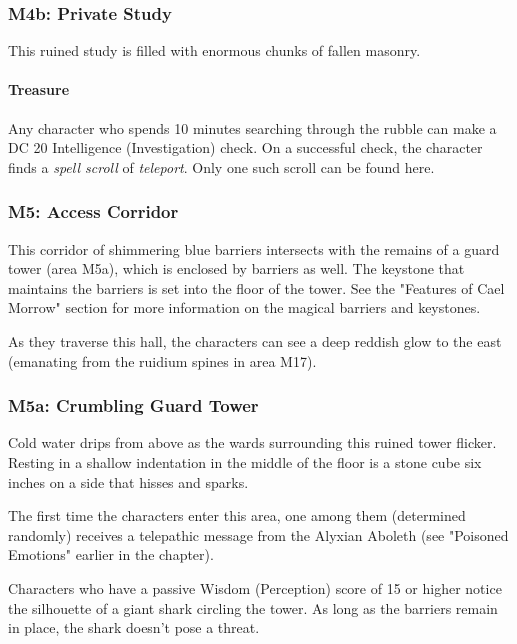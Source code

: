 \documentclass[letterpaper, 11pt, bg=full, twocolumn]{dndbook}
\begin{document}
\subsubsection{M4b: Private Study}

This ruined study is filled with enormous chunks of fallen masonry.

\paragraph{Treasure}

Any character who spends 10 minutes searching through the rubble can make a DC 20 Intelligence (Investigation) check. On a successful check, the character finds a \textit{spell scroll} of \textit{teleport}. Only one such scroll can be found here.

\subsubsection{M5: Access Corridor}

This corridor of shimmering blue barriers intersects with the remains of a guard tower (area M5a), which is enclosed by barriers as well. The keystone that maintains the barriers is set into the floor of the tower. See the "Features of Cael Morrow" section for more information on the magical barriers and keystones.

As they traverse this hall, the characters can see a deep reddish glow to the east (emanating from the ruidium spines in area M17).

\subsubsection{M5a: Crumbling Guard Tower}

\begin{DndReadAloud}
Cold water drips from above as the wards surrounding this ruined tower flicker. Resting in a shallow indentation in the middle of the floor is a stone cube six inches on a side that hisses and sparks.
\end{DndReadAloud}

The first time the characters enter this area, one among them (determined randomly) receives a telepathic message from the Alyxian Aboleth (see "Poisoned Emotions" earlier in the chapter).

Characters who have a passive Wisdom (Perception) score of 15 or higher notice the silhouette of a giant shark circling the tower. As long as the barriers remain in place, the shark doesn't pose a threat.
\end{document}
